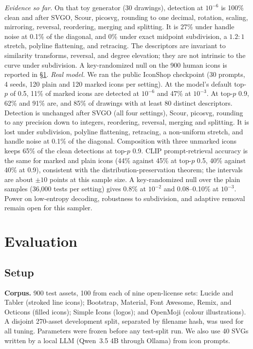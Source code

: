 \documentclass[10pt,twocolumn]{article}
\begin{document}
\emph{Evidence so far.} On that toy generator (30 drawings), detection at $10^{-6}$ is 100\% clean and after SVGO, Scour, picosvg, rounding to one decimal, rotation, scaling, mirroring, reversal, reordering, merging and splitting. It is 27\% under handle noise at 0.1\% of the diagonal, and 0\% under exact midpoint subdivision, a $1.2{:}1$ stretch, polyline flattening, and retracing. The descriptors are invariant to similarity transforms, reversal, and degree elevation; they are not intrinsic to the curve under subdivision. A key-randomized null on the 900 human icons is reported in \S\ref{sec:eval}. \emph{Real model.} We ran the public IconShop checkpoint (30 prompts, 4 seeds, 120 plain and 120 marked icons per setting). At the model's default top-$p$ of 0.5, 11\% of marked icons are detected at $10^{-6}$ and 47\% at $10^{-3}$. At top-$p$ 0.9, 62\% and 91\% are, and 85\% of drawings with at least 80 distinct descriptors. Detection is unchanged after SVGO (all four settings), Scour, picosvg, rounding to any precision down to integers, reordering, reversal, merging and splitting. It is lost under subdivision, polyline flattening, retracing, a non-uniform stretch, and handle noise at 0.1\% of the diagonal. Composition with three unmarked icons keeps 65\% of the clean detections at top-$p$ 0.9. CLIP prompt-retrieval accuracy is the same for marked and plain icons (44\% against 45\% at top-$p$ 0.5, 40\% against 40\% at 0.9), consistent with the distribution-preservation theorem; the intervals are about $\pm10$ points at this sample size. A key-randomized null over the plain samples (36{,}000 tests per setting) gives 0.8\% at $10^{-2}$ and 0.08--0.10\% at $10^{-3}$. Power on low-entropy decoding, robustness to subdivision, and adaptive removal remain open for this sampler.

\section{Evaluation}
\label{sec:eval}
\subsection{Setup}
\textbf{Corpus.} 900 test assets, 100 from each of nine open-license sets: Lucide and Tabler (stroked line icons); Bootstrap, Material, Font Awesome, Remix, and Octicons (filled icons); Simple Icons (logos); and OpenMoji (colour illustrations). A disjoint 270-asset development split, separated by filename hash, was used for all tuning. Parameters were frozen before any test-split run. We also use 40 SVGs written by a local LLM (Qwen~3.5 4B through Ollama) from icon prompts.
\end{document}
